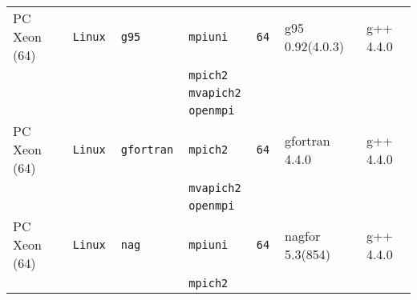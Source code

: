 \begin{longtable}{lllllll}
PC Xeon (64)          &\tt Linux  &\tt g95          &\tt mpiuni     &\tt 64              & g95 \footnotesize 0.92(4.0.3)      & g++  \footnotesize 4.4.0        \\ %
                      &           &                 &\tt mpich2     &                    &                                    &                                 \\
                      &           &                 &\tt mvapich2   &                    &                                    &                                 \\
                      &           &                 &\tt openmpi    &                    &                                    &                                 \\
PC Xeon (64)          &\tt Linux  &\tt gfortran     &\tt mpich2     &\tt 64              & gfortran \footnotesize 4.4.0       & g++  \footnotesize 4.4.0        \\ %
                      &           &                 &\tt mvapich2   &                    &                                    &                                 \\
                      &           &                 &\tt openmpi    &                    &                                    &                                 \\
PC Xeon (64)          &\tt Linux  &\tt nag          &\tt mpiuni     &\tt 64              & nagfor \footnotesize 5.3(854)      & g++  \footnotesize 4.4.0        \\ %
                      &           &                 &\tt mpich2     &                    &                                    &                                 \\

\end{longtable}
